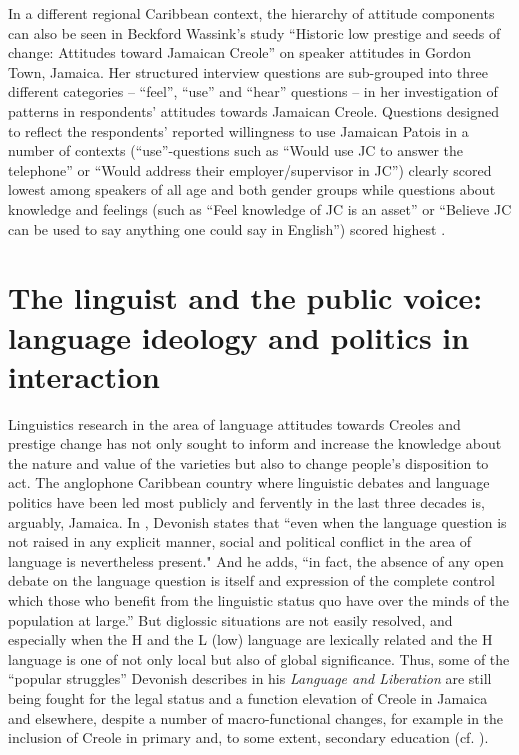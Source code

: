 \documentclass[output=paper,colorlinks,citecolor=brown]{langscibook}
\begin{document}
In a different regional Caribbean context, the hierarchy of attitude components can also be seen in Beckford Wassink's study “Historic low prestige and seeds of change: Attitudes toward Jamaican Creole” \citeyearpar{BeckfordWassink1999} on speaker attitudes in Gordon Town, Jamaica. Her structured interview questions are sub-grouped into three different categories – “feel”, “use” and “hear” questions – in her investigation of patterns in respondents' attitudes towards Jamaican Creole. Questions designed to reflect the respondents' reported willingness to use Jamaican Patois in a number of contexts (“use”-questions such as “Would use JC to answer the telephone” or “Would address their employer/supervisor in JC”) clearly scored lowest among speakers of all age and both gender groups while questions about knowledge and feelings (such as “Feel knowledge of JC is an asset” or “Believe JC can be used to say anything one could say in English”) scored highest \citeyearpar[72]{BeckfordWassink1999}.


\section{The linguist and the public voice: language ideology and politics in interaction}\label{sec:muehleisen:3}

Linguistics research in the area of language attitudes towards Creoles and prestige change has not only sought to inform and increase the knowledge about the nature and value of the varieties but also to change people’s disposition to act. The anglophone Caribbean country where linguistic debates and language politics have been led most publicly and fervently in the last three decades is, arguably, Jamaica. In \citeyear{devonish1986_liberation}, Devonish states that “even when the language question is not raised in any explicit manner, social and political conflict in the area of language is nevertheless present." And he adds, “in fact, the absence of any open debate on the language question is itself and expression of the complete control which those who benefit from the linguistic status quo have over the minds of the population at large.” But diglossic situations are not easily resolved, and especially when the H and the L (low) language are lexically related and the H language is one of not only local but also of global significance. Thus, some of the “popular struggles” Devonish describes in his \textit{Language and Liberation} \citeyearpar[87ff]{devonish1986_liberation} are still being fought for the legal status and a function elevation of Creole in Jamaica and elsewhere, despite a number of macro-functional changes, for example in the inclusion of Creole in primary and, to some extent, secondary education (cf. \citealt{morren_morren2007}).
\end{document}
